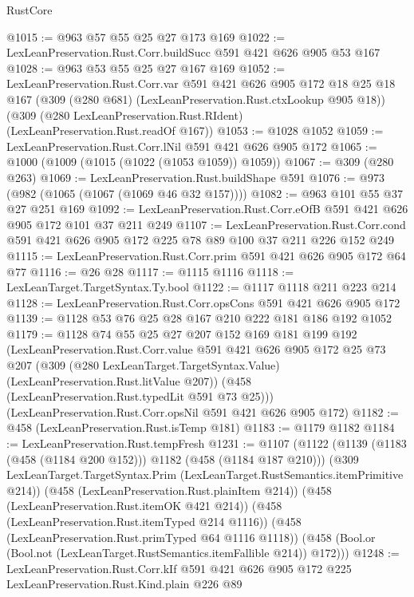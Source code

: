 \begin{lexlean}{RustCore}
\begin{coremodule}
@1015 := @963 @57 @55 @25 @27 @173 @169
@1022 := LexLeanPreservation.Rust.Corr.buildSucc @591 @421 @626 @905 @53 @167
@1028 := @963 @53 @55 @25 @27 @167 @169
@1052 := LexLeanPreservation.Rust.Corr.var
    @591
    @421
    @626
    @905
    @172
    @18
    @25
    @18
    @167
    (@309 (@280 @681) (LexLeanPreservation.Rust.ctxLookup @905 @18))
    (@309 (@280 LexLeanPreservation.Rust.RIdent) (LexLeanPreservation.Rust.readOf @167))
@1053 := @1028 @1052
@1059 := LexLeanPreservation.Rust.Corr.lNil @591 @421 @626 @905 @172
@1065 := @1000 (@1009 (@1015 (@1022 (@1053 @1059)) @1059))
@1067 := @309 (@280 @263)
@1069 := LexLeanPreservation.Rust.buildShape @591
@1076 := @973 (@982 (@1065 (@1067 (@1069 @46 @32 @157))))
@1082 := @963 @101 @55 @37 @27 @251 @169
@1092 := LexLeanPreservation.Rust.Corr.eOfB @591 @421 @626 @905 @172 @101 @37 @211 @249
@1107 := LexLeanPreservation.Rust.Corr.cond
    @591
    @421
    @626
    @905
    @172
    @225
    @78
    @89
    @100
    @37
    @211
    @226
    @152
    @249
@1115 := LexLeanPreservation.Rust.Corr.prim @591 @421 @626 @905 @172 @64 @77
@1116 := @26 @28
@1117 := @1115 @1116
@1118 := LexLeanTarget.TargetSyntax.Ty.bool
@1122 := @1117 @1118 @211 @223 @214
@1128 := LexLeanPreservation.Rust.Corr.opsCons @591 @421 @626 @905 @172
@1139 := @1128 @53 @76 @25 @28 @167 @210 @222 @181 @186 @192 @1052
@1179 := @1128
    @74
    @55
    @25
    @27
    @207
    @152
    @169
    @181
    @199
    @192
    (LexLeanPreservation.Rust.Corr.value
      @591
      @421
      @626
      @905
      @172
      @25
      @73
      @207
      (@309 (@280 LexLeanTarget.TargetSyntax.Value) (LexLeanPreservation.Rust.litValue @207))
      (@458 (LexLeanPreservation.Rust.typedLit @591 @73 @25)))
    (LexLeanPreservation.Rust.Corr.opsNil @591 @421 @626 @905 @172)
@1182 := @458 (LexLeanPreservation.Rust.isTemp @181)
@1183 := @1179 @1182
@1184 := LexLeanPreservation.Rust.tempFresh
@1231 := @1107
    (@1122
      (@1139 (@1183 (@458 (@1184 @200 @152))) @1182 (@458 (@1184 @187 @210)))
      (@309 LexLeanTarget.TargetSyntax.Prim (LexLeanTarget.RustSemantics.itemPrimitive @214))
      (@458 (LexLeanPreservation.Rust.plainItem @214))
      (@458 (LexLeanPreservation.Rust.itemOK @421 @214))
      (@458 (LexLeanPreservation.Rust.itemTyped @214 @1116))
      (@458 (LexLeanPreservation.Rust.primTyped @64 @1116 @1118))
      (@458 (Bool.or (Bool.not (LexLeanTarget.RustSemantics.itemFallible @214)) @172)))
@1248 := LexLeanPreservation.Rust.Corr.kIf
    @591
    @421
    @626
    @905
    @172
    @225
    LexLeanPreservation.Rust.Kind.plain
    @226
    @89

\end{coremodule}
\end{lexlean}
